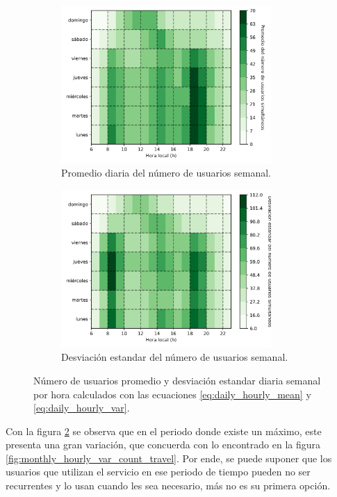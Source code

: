 \begin{figure}[H]
    \centering
    \begin{subfigure}[b]{8cm}
        \includegraphics[width=8cm]{Graphics/daily_hourly_mean_count_travel.png}
        \caption{Promedio diaria del número de usuarios semanal.}
        \label{fig:daily_hourly_mean_count_travel}
    \end{subfigure}
    \begin{subfigure}[b]{8cm}
        \includegraphics[width=8cm]{Graphics/daily_hourly_var_count_travel.png}
        \caption{Desviación estandar del número de usuarios semanal.}
        \label{fig:daily_hourly_var_count_travel}
    \end{subfigure}
    \caption{Número de usuarios promedio y desviación estandar diaria semanal por hora calculados con las ecuaciones \ref{eq:daily_hourly_mean} y \ref{eq:daily_hourly_var}.}
    \label{fig:daily_hourly_count_travel}
\end{figure}

Con la figura \ref{fig:daily_hourly_var_count_travel} se observa que en el periodo donde existe un máximo, este presenta una gran variación, que concuerda con lo encontrado en la figura \ref{fig:monthly_hourly_var_count_travel}. Por ende, se puede suponer que los usuarios que utilizan el servicio en ese periodo de tiempo pueden no ser recurrentes y lo usan cuando les sea necesario, más no es su primera opción.

